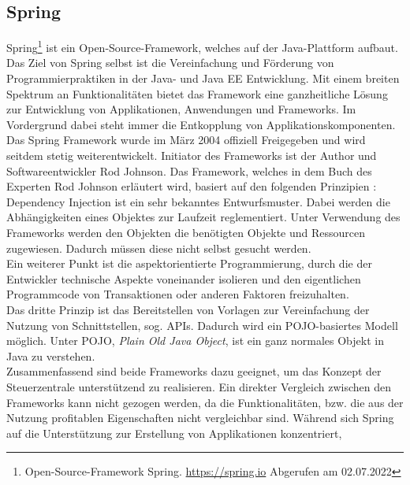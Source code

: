     \subsection{Spring}
    \label{subsec:springBootFramework}
    Spring\footnote{Open-Source-Framework Spring. \url{https://spring.io} Abgerufen am 02.07.2022} ist ein Open-Source-Framework, welches auf der Java-Plattform aufbaut. 
    Das Ziel von Spring selbst ist die Vereinfachung und Förderung von Programmierpraktiken in der Java- und Java EE Entwicklung. Mit einem breiten Spektrum an 
    Funktionalitäten bietet das Framework eine ganzheitliche Lösung zur Entwicklung von Applikationen, Anwendungen und Frameworks. Im Vordergrund dabei steht immer die 
    Entkopplung von Applikationskomponenten. Das Spring Framework wurde im März 2004 offiziell Freigegeben und wird seitdem stetig weiterentwickelt. 
    Initiator des Frameworks ist der Author und Softwareentwickler Rod Johnson. Das Framework, welches in dem Buch des Experten Rod Johnson erläutert wird, basiert auf 
    den folgenden Prinzipien \cite{johnson2004expert}: 
    \\
    \linebreak
    Dependency Injection ist ein sehr bekanntes Entwurfsmuster. Dabei werden die Abhängigkeiten eines Objektes zur Laufzeit reglementiert. Unter 
    Verwendung des Frameworks werden den Objekten die benötigten Objekte und Ressourcen zugewiesen. Dadurch müssen diese nicht selbst gesucht werden. 
    \\
    \linebreak
    Ein weiterer Punkt ist die aspektorientierte Programmierung, durch die der Entwickler technische Aspekte voneinander isolieren und den eigentlichen Programmcode 
    von Transaktionen oder anderen Faktoren freizuhalten. 
    \\
    \linebreak
    Das dritte Prinzip ist das Bereitstellen von Vorlagen zur Vereinfachung der Nutzung von Schnittstellen, sog. \acs{API}s. Dadurch wird ein POJO-basiertes Modell 
    möglich. Unter POJO, \textit{Plain Old Java Object}, ist ein ganz normales Objekt in Java zu verstehen. 
    \\
    \linebreak
    Zusammenfassend sind beide Frameworks dazu geeignet, um das Konzept der Steuerzentrale unterstützend zu realisieren. 
    Ein direkter Vergleich zwischen den Frameworks kann nicht gezogen werden, da die Funktionalitäten, bzw. die aus der Nutzung 
    profitablen Eigenschaften nicht vergleichbar sind. Während sich Spring auf die Unterstützung zur Erstellung von Applikationen konzentriert, 
